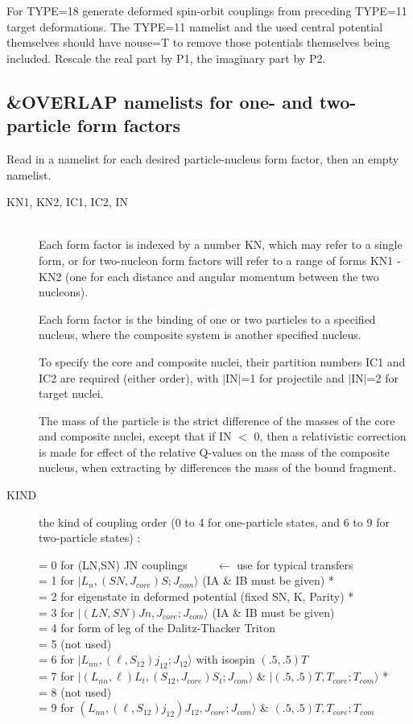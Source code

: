 \documentclass[11pt]{article}
\begin{document}
For TYPE=18  generate deformed spin-orbit couplings from preceding TYPE=11 target 
deformations.  The TYPE=11 namelist and the used central potential themselves should
have nouse=T to remove those potentials  themselves  being included.
Rescale the real part by P1, the imaginary part by P2.

\newpage
\subsection{\&OVERLAP namelists for one- and two-particle form factors}
%


Read in a namelist for each desired particle-nucleus form factor, then an empty namelist.

\begin{description}
\item[KN1, KN2, IC1, IC2, IN]  ~\\
Each form factor is indexed by a number KN, which may refer to
a single form, or for two-nucleon form factors will refer to a range
of forms KN1 - KN2
(one for each distance and angular momentum between the two nucleons).

Each form factor is the binding of one or two particles to a
specified nucleus, where the composite system is another specified
nucleus.

To specify the core and composite nuclei, their partition numbers
IC1 and IC2 are required (either order), with $|$IN$|$=1 for projectile
and $|$IN$|$=2 for target nuclei.

The mass of the particle is the strict difference of the masses of
the core and composite nuclei, except that if IN $<$ 0, then a
relativistic correction is made for effect of the relative Q-values
on the mass of the composite nucleus, when extracting by differences
the mass of the bound fragment.


\item[KIND]
the kind of coupling order (0 to 4 for one-particle states, and
6 to 9 for two-particle states) :

= 0 for (LN,SN) JN couplings   ~ ~ ~$\leftarrow$ use for typical transfers\\
= 1 for $|L_{n}, (SN,J_{core})S ; J_{com}\rangle$  (IA \& IB must be given) *\\
= 2 for eigenstate in deformed potential (fixed SN, K, Parity)  *\\
= 3 for $|(LN,SN)Jn, J_{core}; J_{com}\rangle$    (IA \& IB must be given)\\
= 4 for form of leg of the Dalitz-Thacker Triton\\
= 5  (not used)\\
= 6 for $|L_{nn}, (\ell,S_{12})j_{12}; J_{12}\rangle$  with isospin $(.5,.5) T$\\
= 7 for $|(L_{nn},\ell)L_t, (S_{12},J_{core})S_t ;  J_{com}\rangle$ \& $|(.5,.5)T,T_{core};T_{com}\rangle$  *\\
= 8  (not used)\\
= 9 for $(L_{nn},(\ell,S_{12})j_{12})J_{12}, J_{core}; J_{com}\rangle$ \&
$(.5,.5)T,T_{core};T_{com}$


\end{description}
\end{document}

